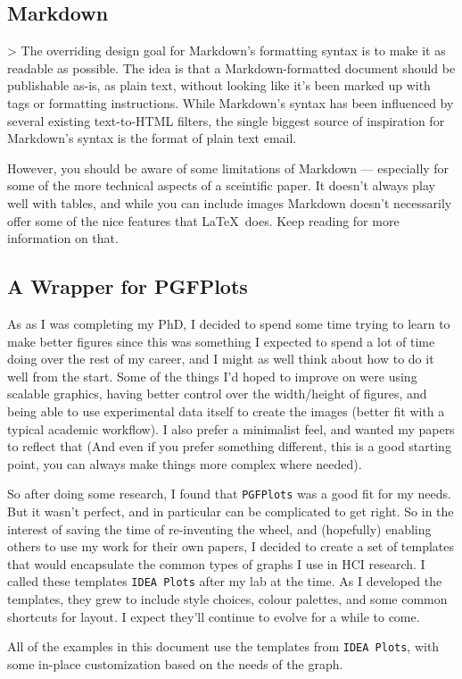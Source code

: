 \subsection{Markdown}
\begin{markdown}

>    The overriding design goal for Markdown’s formatting syntax is to make it as readable as possible. The idea is that a Markdown-formatted document should be publishable as-is, as plain text, without looking like it’s been marked up with tags or formatting instructions. While Markdown’s syntax has been influenced by several existing text-to-HTML filters, the single biggest source of inspiration for Markdown’s syntax is the format of plain text email.

However, you should be aware of some limitations of Markdown --- especially for some of the more technical aspects of a sceintific paper. It doesn't always play well with tables, and while you can include images Markdown doesn't necessarily offer some of the nice features that \LaTeX\ does. Keep reading for more information on that. 
\end{markdown}


\subsection{A Wrapper for PGFPlots}
As as I was completing my PhD, I decided to spend some time trying to learn to make better figures since this was something I expected to spend a lot of time doing over the rest of my career, and I might as well think about how to do it well from the start. Some of the things I'd hoped to improve on were using scalable graphics, having better control over the width/height of figures, and being able to use experimental data itself to create the images (better fit with a typical academic workflow). I also prefer a minimalist feel, and wanted my papers to reflect that (And even if you prefer something different, this is a good starting point, you can always make things more complex where needed). 

So after doing some research, I found that \texttt{PGFPlots} was a good fit for my needs. But it wasn't perfect, and in particular can be complicated to get right. So in the interest of saving the time of re-inventing the wheel, and (hopefully) enabling others to use my work for their own papers, I decided to create a set of templates that would encapsulate the common types of graphs I use in HCI research. I called these templates \texttt{IDEA Plots} after my lab at the time. As I developed the templates, they grew to include style choices, colour palettes, and some common shortcuts for layout. I expect they'll continue to evolve for a while to come.  

All of the examples in this document use the templates from \texttt{IDEA Plots}, with some in-place customization based on the needs of the graph. 